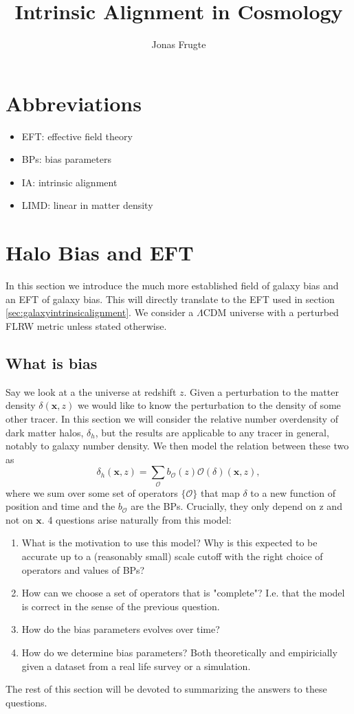 \documentclass[11pt]{article}
\title{Intrinsic Alignment in Cosmology}
\author[1]{Jonas Frugte}
\affiliation[1]{Van Swinderen Institute for Particle Physics and Gravity, University of Groningen, Nijenborgh 4, 9747 AG Groningen, The Netherlands}
\begin{document}
\maketitle
\section*{Abbreviations}
\begin{itemize}
    \item[] EFT: effective field theory
    \item[] BPs: bias parameters
    \item[] IA: intrinsic alignment
    \item[] LIMD: linear in matter density
\end{itemize}

\section{Halo Bias and EFT}
In this section we introduce the much more established field of galaxy bias and an EFT of galaxy bias. This will directly translate to the EFT used in section \ref{sec:galaxyintrinsicalignment}. We consider a $\Lambda$CDM universe with a perturbed FLRW metric unless stated otherwise.

\subsection{What is bias}
Say we look at a the universe at redshift $z$. Given a perturbation to the matter density $\delta(\mathbf x, z)$ we would like to know the perturbation to the density of some other tracer. In this section we will consider the relative number overdensity of dark matter halos, $\delta_h$, but the results are applicable to any tracer in general, notably to galaxy number density. We then model the relation between these two as
\begin{equation}
    \delta_h(\mathbf x, z) = \sum_{\mathcal O} b_{\mathcal O}(z) \mathcal O(\delta)(\mathbf x, z),
\end{equation}
where we sum over some set of operators $\{\mathcal O\}$ that map $\delta$ to a new function of position and time and the $b_{\mathcal O}$ are the BPs. Crucially, they only depend on z and not on $\mathbf x$. 4 questions arise naturally from this model:
\begin{enumerate}
    \item What is the motivation to use this model? Why is this expected to be accurate up to a (reasonably small) scale cutoff with the right choice of operators and values of BPs?
    \item How can we choose a set of operators that is "complete"? I.e. that the model is correct in the sense of the previous question.
    \item How do the bias parameters evolves over time?
    \item How do we determine bias parameters? Both theoretically and empiricially given a dataset from a real life survey or a simulation.
\end{enumerate}
The rest of this section will be devoted to summarizing the answers to these questions.
\end{document}
